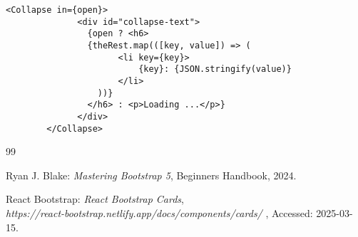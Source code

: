 \documentclass[12pt]{article}
\begin{document}
\begin{lstlisting}[label=Collapse,style=JSES6Base, caption={Collapible card component}]
	<Collapse in={open}>
              <div id="collapse-text">
                {open ? <h6> 
                {theRest.map(([key, value]) => (
                      <li key={key}>
                          {key}: {JSON.stringify(value)}
                      </li>
                  ))}
                </h6> : <p>Loading ...</p>}
              </div>
        </Collapse>
\end{lstlisting}

%
%
%
%
\begin {thebibliography}{99}
%



 Ryan J. Blake:
	      {\em Mastering Bootstrap 5},
	     Beginners Handbook,
       2024.

       
 React Bootstrap:
        {\em React Bootstrap Cards},\\
        {\em https://react-bootstrap.netlify.app/docs/components/cards/ },
       Accessed: 2025-03-15.

\end {thebibliography}
\end{document}
